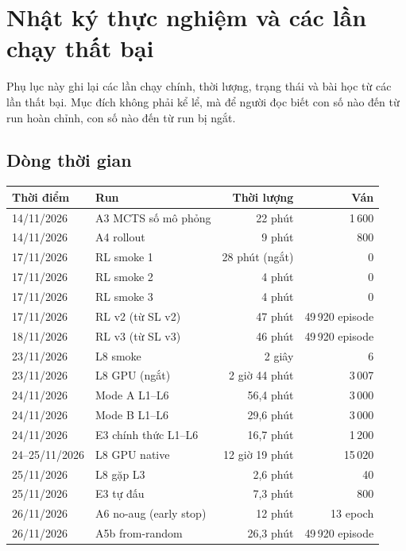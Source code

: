 \chapter{Nhật ký thực nghiệm và các lần chạy thất bại}
\label{app:nhat-ky}

Phụ lục này ghi lại các lần chạy chính, thời lượng, trạng thái và bài học từ các lần thất bại.
Mục đích không phải kể lể, mà để người đọc biết con số nào đến từ run hoàn chỉnh, con số nào
đến từ run bị ngắt.

\section{Dòng thời gian}
\begin{center}\small
\begin{longtable}{@{}l l r r@{}}
\toprule
\textbf{Thời điểm} & \textbf{Run} & \textbf{Thời lượng} & \textbf{Ván} \\
\midrule
14/11/2026 & A3 MCTS số mô phỏng & 22 phút & 1\,600 \\
14/11/2026 & A4 rollout & 9 phút & 800 \\
17/11/2026 & RL smoke 1 & 28 phút (ngắt) & 0 \\
17/11/2026 & RL smoke 2 & 4 phút & 0 \\
17/11/2026 & RL smoke 3 & 4 phút & 0 \\
17/11/2026 & RL v2 (từ SL v2) & 47 phút & 49\,920 episode \\
18/11/2026 & RL v3 (từ SL v3) & 46 phút & 49\,920 episode \\
23/11/2026 & L8 smoke & 2 giây & 6 \\
23/11/2026 & L8 GPU (ngắt) & 2 giờ 44 phút & 3\,007 \\
24/11/2026 & Mode A L1--L6 & 56,4 phút & 3\,000 \\
24/11/2026 & Mode B L1--L6 & 29,6 phút & 3\,000 \\
24/11/2026 & E3 chính thức L1--L6 & 16,7 phút & 1\,200 \\
24--25/11/2026 & L8 GPU native & 12 giờ 19 phút & 15\,020 \\
25/11/2026 & L8 gặp L3 & 2,6 phút & 40 \\
25/11/2026 & E3 tự đấu & 7,3 phút & 800 \\
26/11/2026 & A6 no-aug (early stop) & ~12 phút & 13 epoch \\
26/11/2026 & A5b from-random & 26,3 phút & 49\,920 episode \\
\bottomrule
\end{longtable}
\end{center}

